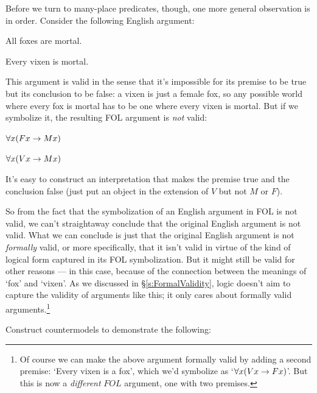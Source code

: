 Before we turn to many-place predicates, though, one more general observation is in order.  Consider the following English argument:
\begin{earg}
	\item[] All foxes are mortal.
	\item[$\therefore$] Every vixen is mortal.
\end{earg}
This argument is valid in the sense that it's impossible for its premise to be true but its conclusion to be false: a vixen is just a female fox, so any possible world where every fox is mortal has to be one where every vixen is mortal.  But if we symbolize it, the resulting FOL argument is \emph{not} valid:
\begin{earg}
	\item[] $\forall x(Fx \rightarrow Mx)$
	\item[$\therefore$] $\forall x(Vx \rightarrow Mx)$
\end{earg}
It's easy to construct an interpretation that makes the premise true and the conclusion false (just put an object in the extension of $V$ but not $M$ or $F$).

So from the fact that the symbolization of an English argument in FOL is not valid, we can't straightaway conclude that the original English argument is not valid.   What we can conclude is just that the original English argument is not \emph{formally} valid, or more specifically, that it isn't valid in virtue of the kind of logical form captured in its FOL symbolization.  But it might still be valid for other reasons --- in this case, because of the connection between the meanings of `fox' and `vixen'.  As we discussed in \S\ref{s:FormalValidity}, logic doesn't aim to capture the validity of arguments like this; it only cares about formally valid arguments.\footnote{Of course we can make the above argument formally valid by adding a second premise: `Every vixen is a fox', which we'd symbolize as `$\forall x(Vx \rightarrow Fx)$'.  But this is now a \emph{different}  $FOL$ argument, one with two premises.}

\practiceproblems
\problempart Construct countermodels to demonstrate the following:

